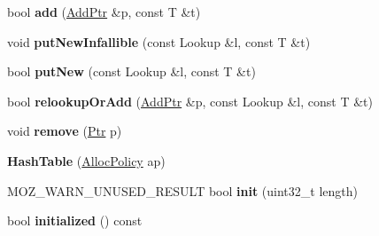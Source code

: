 \begin{DoxyCompactItemize}
\item 
\hypertarget{classjs_1_1detail_1_1_hash_table_acef08b3535ebd3ba4a92187a40b5be5c}{bool {\bfseries add} (\hyperlink{classjs_1_1detail_1_1_hash_table_1_1_add_ptr}{Add\-Ptr} \&p, const T \&t)}\label{classjs_1_1detail_1_1_hash_table_acef08b3535ebd3ba4a92187a40b5be5c}

\item 
\hypertarget{classjs_1_1detail_1_1_hash_table_a910d89f0b45a40ad2782278f5e9a0a8b}{void {\bfseries put\-New\-Infallible} (const Lookup \&l, const T \&t)}\label{classjs_1_1detail_1_1_hash_table_a910d89f0b45a40ad2782278f5e9a0a8b}

\item 
\hypertarget{classjs_1_1detail_1_1_hash_table_abb09e6e249c7aa8d6c5d8ea09b790bd7}{bool {\bfseries put\-New} (const Lookup \&l, const T \&t)}\label{classjs_1_1detail_1_1_hash_table_abb09e6e249c7aa8d6c5d8ea09b790bd7}

\item 
\hypertarget{classjs_1_1detail_1_1_hash_table_a4c70a4f969c90b0bb890d00ea517ff0d}{bool {\bfseries relookup\-Or\-Add} (\hyperlink{classjs_1_1detail_1_1_hash_table_1_1_add_ptr}{Add\-Ptr} \&p, const Lookup \&l, const T \&t)}\label{classjs_1_1detail_1_1_hash_table_a4c70a4f969c90b0bb890d00ea517ff0d}

\item 
\hypertarget{classjs_1_1detail_1_1_hash_table_a67fc36bb65a94e96ea2281b8c00b2538}{void {\bfseries remove} (\hyperlink{classjs_1_1detail_1_1_hash_table_1_1_ptr}{Ptr} p)}\label{classjs_1_1detail_1_1_hash_table_a67fc36bb65a94e96ea2281b8c00b2538}

\item 
\hypertarget{classjs_1_1detail_1_1_hash_table_a216372476778fd3dbc5508254d0c23ae}{{\bfseries Hash\-Table} (\hyperlink{class_alloc_policy}{Alloc\-Policy} ap)}\label{classjs_1_1detail_1_1_hash_table_a216372476778fd3dbc5508254d0c23ae}

\item 
\hypertarget{classjs_1_1detail_1_1_hash_table_ac3e5f422cf6bfaba624dac0c65fc5b9d}{M\-O\-Z\-\_\-\-W\-A\-R\-N\-\_\-\-U\-N\-U\-S\-E\-D\-\_\-\-R\-E\-S\-U\-L\-T bool {\bfseries init} (uint32\-\_\-t length)}\label{classjs_1_1detail_1_1_hash_table_ac3e5f422cf6bfaba624dac0c65fc5b9d}

\item 
\hypertarget{classjs_1_1detail_1_1_hash_table_afc6e176a575620e0b49d5cdf8c619123}{bool {\bfseries initialized} () const }\label{classjs_1_1detail_1_1_hash_table_afc6e176a575620e0b49d5cdf8c619123}


\end{DoxyCompactItemize}
